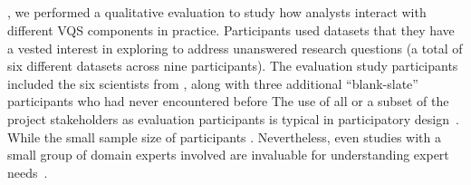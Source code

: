   \subsection{}
  , we performed a qualitative evaluation to study how analysts interact with different VQS components in practice. Participants used datasets that they have a vested interest in exploring to address unanswered research questions (a total of six different datasets across nine participants). The evaluation study participants included the six scientists from , along with three additional ``blank-slate'' participants who had never encountered \zvpp before  The use of all or a subset of the project stakeholders as evaluation participants is typical in participatory design~\cite{Bossen2016}. While the small sample size of participants . Nevertheless, even studies with a small group of domain experts involved are invaluable for understanding expert needs~\cite{Sedlmair2012}. %
